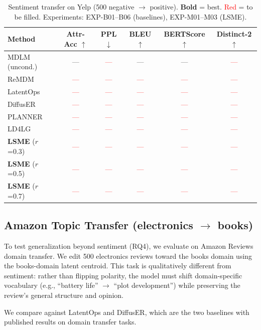 \documentclass{article}
\newcommand{\tbd}[1]{\textcolor{red}{#1}}  %
\newcommand{\best}[1]{\textbf{#1}}          %
\begin{document}
\begin{table}[h]
\centering
\caption{Sentiment transfer on Yelp (500 negative $\to$ positive). \best{Bold} = best. \tbd{Red} = to be filled. Experiments: EXP-B01--B06 (baselines), EXP-M01--M03 (LSME).}
\label{tab:yelp_results}
\begin{tabular}{lccccc}
\toprule
\textbf{Method} & \textbf{Attr-Acc $\uparrow$} & \textbf{PPL $\downarrow$} & \textbf{BLEU $\uparrow$} & \textbf{BERTScore $\uparrow$} & \textbf{Distinct-2 $\uparrow$} \\
\midrule
MDLM (uncond.) & --- & \tbd{---} & --- & --- & \tbd{---} \\
ReMDM & \tbd{---} & \tbd{---} & \tbd{---} & \tbd{---} & \tbd{---} \\
LatentOps & \tbd{---} & \tbd{---} & \tbd{---} & \tbd{---} & \tbd{---} \\
DiffusER & \tbd{---} & \tbd{---} & \tbd{---} & \tbd{---} & \tbd{---} \\
PLANNER & \tbd{---} & \tbd{---} & \tbd{---} & \tbd{---} & \tbd{---} \\
LD4LG & \tbd{---} & \tbd{---} & \tbd{---} & \tbd{---} & \tbd{---} \\
\midrule
\textbf{LSME} ($r$=0.3) & \tbd{---} & \tbd{---} & \tbd{---} & \tbd{---} & \tbd{---} \\
\textbf{LSME} ($r$=0.5) & \tbd{---} & \tbd{---} & \tbd{---} & \tbd{---} & \tbd{---} \\
\textbf{LSME} ($r$=0.7) & \tbd{---} & \tbd{---} & \tbd{---} & \tbd{---} & \tbd{---} \\
\bottomrule
\end{tabular}
\end{table}

\subsection{Amazon Topic Transfer (\texorpdfstring{electronics $\to$ books}{electronics to books})}

To test generalization beyond sentiment (RQ4), we evaluate on Amazon Reviews domain transfer. We edit 500 electronics reviews toward the books domain using the books-domain latent centroid. This task is qualitatively different from sentiment: rather than flipping polarity, the model must shift domain-specific vocabulary (e.g., ``battery life'' $\to$ ``plot development'') while preserving the review's general structure and opinion.

We compare against LatentOps and DiffusER, which are the two baselines with published results on domain transfer tasks.
\end{document}
